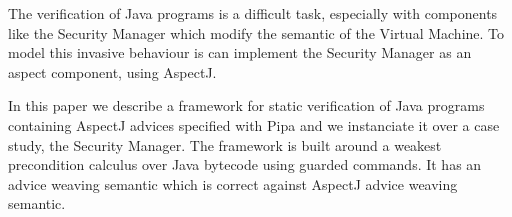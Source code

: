The verification of Java programs is a difficult task, especially with
components like the Security Manager which modify the semantic of the
Virtual Machine.  To model this invasive behaviour is
can implement the Security Manager as an aspect component, using AspectJ.

In this paper we describe a framework for static verification of Java
programs containing AspectJ advices specified with Pipa and
we instanciate it over a case study, the Security Manager.  The
framework is built around a weakest precondition calculus over Java
bytecode using guarded commands. It has an advice weaving 
semantic which is correct against AspectJ advice weaving semantic.  


